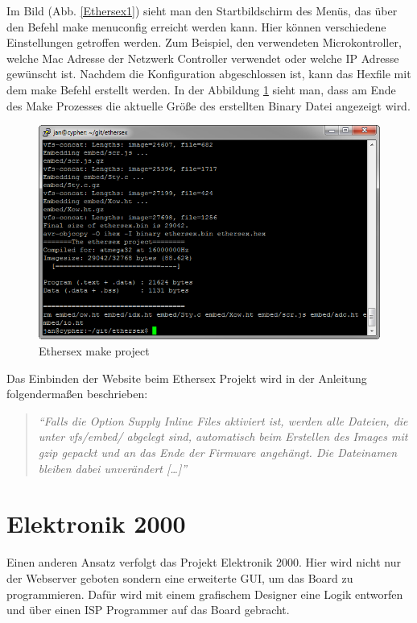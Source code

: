 Im Bild (Abb. \ref{Ethersex1}) sieht man den Startbildschirm des
Menüs, das über den Befehl \textrm{make menuconfig} erreicht werden kann.
Hier können verschiedene Einstellungen getroffen werden. Zum Beispiel, den
verwendeten Microkontroller, welche Mac Adresse der Netzwerk Controller
verwendet oder welche IP Adresse gewünscht ist.
Nachdem die Konfiguration abgeschlossen ist, kann das Hexfile mit dem
\textrm{make} Befehl erstellt werden. In der Abbildung \ref{Ethersex2} sieht man,
dass am Ende des \textrm{Make} Prozesses die aktuelle Größe des erstellten Binary Datei
angezeigt wird.

\begin{figure}[H]
	\centering
		\includegraphics[width=13cm]{content/pictures/Recherche/Ethersex/Ethersex2.png}
	\caption{Ethersex make project}
	\label{Ethersex2}
\end{figure} 

Das Einbinden der Website beim Ethersex Projekt wird in der Anleitung
folgendermaßen beschrieben:

\begin{quote}
	\textit{
		\enquote{Falls die Option Supply Inline Files aktiviert ist, werden alle
		Dateien, die unter vfs/embed/ abgelegt sind, automatisch beim Erstellen des
		Images mit gzip gepackt und an das Ende der Firmware angehängt. Die
		Dateinamen bleiben dabei unverändert [\ldots]} }
	\cite[\url{http://www.ethersex.de/index.php/HTTPD_(Deutsch)}]{Ethersex}
\end{quote}

\section{Elektronik 2000}

Einen anderen Ansatz verfolgt das Projekt Elektronik 2000.
Hier wird nicht nur der Webserver geboten sondern eine erweiterte GUI, um das
Board zu programmieren. Dafür wird mit einem grafischem Designer eine Logik
entworfen und über einen ISP Programmer auf das Board gebracht.

